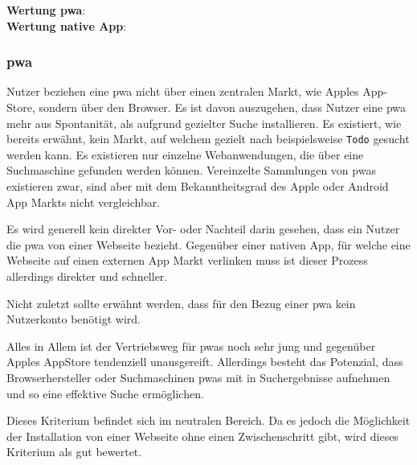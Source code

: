 \textbf{Wertung \ac{pwa}}:  \Circle \\
\textbf{Wertung native App}:  \\
\subsubsection{\ac{pwa}}
Nutzer beziehen eine \ac{pwa} nicht über einen zentralen Markt, wie Apples App-Store, sondern über den Browser. Es ist davon auszugehen, dass Nutzer eine \ac{pwa} mehr aus Spontanität, als aufgrund gezielter Suche installieren. Es existiert, wie bereits erwähnt, kein Markt, auf welchem gezielt nach beispielsweise \texttt{Todo} gesucht werden kann. Es existieren nur einzelne Webanwendungen, die über eine Suchmaschine gefunden werden können. Vereinzelte Sammlungen von \ac{pwa}s existieren zwar, sind aber mit dem Bekanntheitsgrad des Apple oder Android App Markts nicht vergleichbar.

Es wird generell kein direkter Vor- oder Nachteil darin gesehen, dass ein Nutzer die \ac{pwa} von einer Webseite bezieht. Gegenüber einer nativen App, für welche eine Webseite auf einen externen App Markt verlinken muss ist dieser Prozess allerdings direkter und schneller.

Nicht zuletzt sollte erwähnt werden, dass für den Bezug einer \ac{pwa} kein Nutzerkonto benötigt wird.

Alles in Allem ist der Vertriebsweg für \ac{pwa}s noch sehr jung und gegenüber Apples AppStore tendenziell unausgereift. Allerdings besteht das Potenzial, dass Browserhersteller oder Suchmaschinen \ac{pwa}s mit in Suchergebnisse aufnehmen und so eine effektive Suche ermöglichen.

Dieses Kriterium befindet sich im neutralen Bereich. Da es jedoch die Möglichkeit der Installation von einer Webseite ohne einen Zwischenschritt gibt, wird dieses Kriterium als gut bewertet.